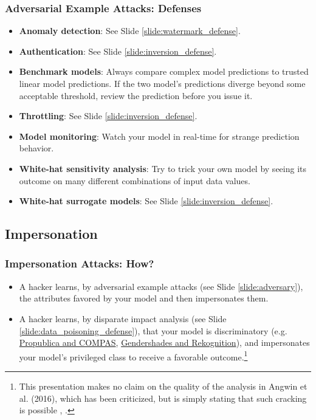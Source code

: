 \documentclass[11pt,
               aspectratio=169,
               hyperref={colorlinks}
               ]{beamer}
\begin{document}
			\begin{frame}
		
				\frametitle{Adversarial Example Attacks: \textbf{Defenses}}		
			
				\begin{itemize}
					\item \textbf{Anomaly detection}: See Slide \ref{slide:watermark_defense}. 
					\item \textbf{Authentication}: See Slide \ref{slide:inversion_defense}. 
					\item \textbf{Benchmark models}: Always compare complex model predictions to trusted linear model predictions. If the two model’s predictions diverge beyond some acceptable threshold, review the prediction before you issue it.
					\item \textbf{Throttling}: See Slide \ref{slide:inversion_defense}. 
					\item \textbf{Model monitoring}: Watch your model in real-time for strange prediction behavior.
					\item \textbf{White-hat sensitivity analysis}: Try to trick your own model by seeing its outcome on many different combinations of input data values.
					\item \textbf{White-hat surrogate models}: See Slide \ref{slide:inversion_defense}. 
				\end{itemize}

			\end{frame}

		\subsection{Impersonation}

			\begin{frame}
		
				\frametitle{Impersonation Attacks: \textbf{How?}}		
			
				\begin{itemize}
					\item A hacker learns, by adversarial example attacks (see Slide \ref{slide:adversary}), the attributes favored by your model and then impersonates them.
					\item A hacker learns, by disparate impact analysis (see Slide \ref{slide:data_poisoning_defense}), that your model is discriminatory (e.g. \href{https://www.propublica.org/article/machine-bias-risk-assessments-in-criminal-sentencing}{Propublica and COMPAS}, \href{https://medium.com/@Joy.Buolamwini/response-racial-and-gender-bias-in-amazon-rekognition-commercial-ai-system-for-analyzing-faces-a289222eeced}{Gendershades and Rekognition}), and impersonates your model's privileged class to receive a favorable outcome.\footnote{This presentation makes no claim on the quality of the analysis in Angwin et al. (2016), which has been criticized, but is simply stating that such cracking is possible \cite{angwin16,}, \cite{flores2016false}.}
				\end{itemize}
				
			\end{frame}
\end{document}
